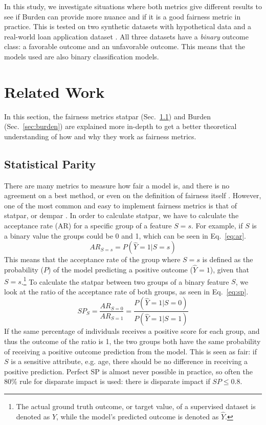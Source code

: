 \documentclass[runningheads]{llncs}
\begin{document}
In this study, we investigate situations where both metrics give different results to see if \gls{Burden} can provide more nuance and if it is a good fairness metric in practice. This is tested on two synthetic datasets with hypothetical data and a real-world loan application dataset \cite{dataset}. All three datasets have a \emph{binary} outcome class: a favorable outcome and an unfavorable outcome. This means that the models used are also binary classification models.

\section{Related Work}\label{sec:relatedwork}

In this section, the fairness metrics \gls{statpar} (Sec.~\ref{sec:sp}) and \gls{Burden} (Sec.~\ref{sec:burden}) are explained more in-depth to get a better theoretical understanding of how and why they work as fairness metrics.

\subsection{Statistical Parity}\label{sec:sp}
There are many metrics to measure how fair a model is, and there is no agreement on a best method, or even on the definition of fairness itself \cite{chouldechova2018frontiers}. However, one of the most common and easy to implement fairness metrics is that of \gls{statpar}, or \gls{dempar} \cite{kamiran2009demographicparity}.
In order to calculate \gls{statpar}, we have to calculate the acceptance rate (AR) for a specific group of a feature $S=s$. For example, if $S$ is a binary value the groups could be 0 and 1, which can be seen in Eq.~\ref{eq:ar}.
\begin{equation}\label{eq:ar}
 AR_{S=s} = P(\hat{Y}=1|S=s)
\end{equation}
This means that the acceptance rate of the group where $S=s$ is defined as the probability ($P$) of the model predicting a positive outcome ($\hat{Y}=1$), given that $S=s$.\footnote{The actual ground truth outcome, or target value, of a supervised dataset is denoted as $Y$, while the model's predicted outcome is denoted as $\hat{Y}$.} To calculate the \gls{statpar} between two groups of a binary feature $S$, we look at the ratio of the acceptance rate of both groups, as seen in Eq.~\ref{eq:sp}.
\begin{equation}\label{eq:sp}
    SP_{S} = \frac{AR_{S=0}}{AR_{S=1}} = \frac{P(\hat{Y}=1|S=0)}{P(\hat{Y}=1|S=1)} 
\end{equation}
If the same percentage of individuals receives a positive score for each group, and thus the outcome of the ratio is 1, the two groups both have the same probability of receiving a positive outcome prediction from the model. This is seen as fair: if $S$ is a sensitive attribute, e.g. age, there should be no difference in receiving a positive prediction. Perfect SP is almost never possible in practice, so often the 80\% rule for disparate impact \cite{feldman2015certifying} is used: there is disparate impact if $SP \leq 0.8$.
\end{document}
